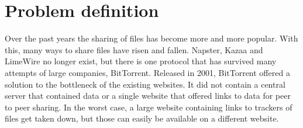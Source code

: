 \section{Problem definition}
Over the past years the sharing of files has become more and more popular. 
With this, many ways to share files have risen and fallen.
Napster, Kazaa and LimeWire no longer exist, but there is one protocol that has survived many attempts of large companies, BitTorrent.
Released in 2001, BitTorrent offered a solution to the bottleneck of the existing websites.
It did not contain a central server that contained data or a single website that offered links to data for peer to peer sharing.
In the worst case, a large website containing links to trackers of files get taken down, but those can easily be available on a different website.




